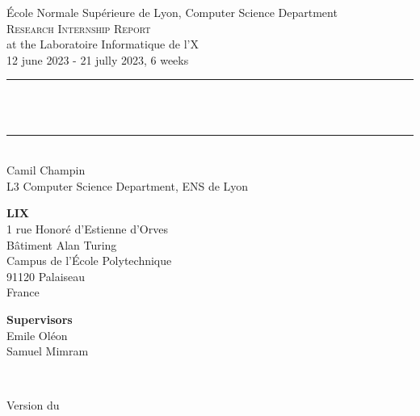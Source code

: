 \documentclass[a4paper]{report}
\makeatletter
\let\thetitle\@title
\let\thedate\@date
\makeatother
\begin{document}
\begin{titlepage}
  \begin{center}
        {\Large
        École Normale Supérieure de Lyon, Computer Science Department}\\[1.5 cm]
        \textsc{\LARGE Research Internship Report}
    \\[.5 cm]
    \large at the Laboratoire Informatique de l'X\\[.2 cm]
    12 june 2023 - 21 jully 2023, 6 weeks\\[1 cm]
    \rule{\linewidth}{0.2 mm} \\[1 cm]
    { \huge \bfseries \thetitle}\\[.7 cm]
    \rule{\linewidth}{0.2 mm} \\[1 cm]
        {\Large Camil Champin}\\[.2 cm]
        {\large L3 Computer Science Department, ENS de Lyon}\\[1 cm]
    \end{center}
    \begin{minipage}{0.5\textwidth}
      \begin{flushleft} \large
            \textbf{LIX}\\
            1 rue Honoré d'Estienne d'Orves\\
            Bâtiment Alan Turing\\
            Campus de l'École Polytechnique\\
            91120 Palaiseau\\
            France\\
        \end{flushleft}
      \end{minipage}
      \begin{minipage}{0.5\textwidth}
        \begin{flushright} \large
          \textbf{Supervisors} \\
            Emile Oléon\\
            Samuel Mimram\\
          \end{flushright}
        \end{minipage}\\[2 cm]
        \begin{center} Version du \thedate
        \end{center}
\end{titlepage}
\end{document}

